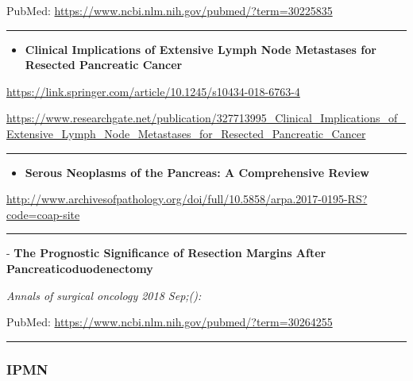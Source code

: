 \documentclass[]{article}
\providecommand{\tightlist}{%
  \setlength{\itemsep}{0pt}\setlength{\parskip}{0pt}}
\begin{document}
PubMed: \url{https://www.ncbi.nlm.nih.gov/pubmed/?term=30225835}

{}

{}

\begin{center}\rule{0.5\linewidth}{\linethickness}\end{center}

\begin{itemize}
\tightlist
\item
  \textbf{Clinical Implications of Extensive Lymph Node Metastases for
  Resected Pancreatic Cancer}
\end{itemize}

\url{https://link.springer.com/article/10.1245/s10434-018-6763-4}

\url{https://www.researchgate.net/publication/327713995_Clinical_Implications_of_Extensive_Lymph_Node_Metastases_for_Resected_Pancreatic_Cancer}

\begin{center}\rule{0.5\linewidth}{\linethickness}\end{center}

\begin{itemize}
\tightlist
\item
  \textbf{Serous Neoplasms of the Pancreas: A Comprehensive Review}
\end{itemize}

\url{http://www.archivesofpathology.org/doi/full/10.5858/arpa.2017-0195-RS?code=coap-site}

\begin{center}\rule{0.5\linewidth}{\linethickness}\end{center}

 - \textbf{The Prognostic Significance of Resection Margins After
Pancreaticoduodenectomy}

\emph{Annals of surgical oncology 2018 Sep;():}

PubMed: \url{https://www.ncbi.nlm.nih.gov/pubmed/?term=30264255}

{}

{}

\begin{center}\rule{0.5\linewidth}{\linethickness}\end{center}

\hypertarget{ipmn}{%
\subsubsection{IPMN}\label{ipmn}}
\end{document}
